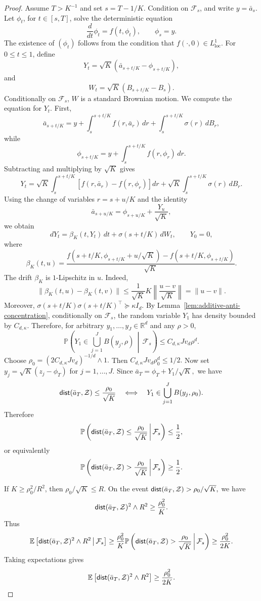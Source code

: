 \documentclass{article}
\newcommand{\1}{\mathbbm{1}}
\newcommand{\dist}{{\sf dist}}
\numberwithin{equation}{section}
\begin{document}
\begin{proof}
Assume \(T>K^{-1}\) and set
$
s=T-1/K.
$
Condition on \(\mathcal F_s\), and write
$
y=\bar a_s.
$
Let \(\phi_t\), for \(t\in[s,T]\), solve the deterministic equation
\[
\frac{d}{dt}\phi_t=f(t,\phi_t),
\qquad
\phi_s=y.
\]
The existence of \((\phi_t)\) follows from the condition that
\(f(\cdot,0)\in L^1_{\mathrm{loc}}\). For \(0\le t\le1\), define
\[
Y_t=\sqrt K\left(\bar a_{s+t/K}-\phi_{s+t/K}\right),
\]
and
\[
W_t=\sqrt K\left(B_{s+t/K}-B_s\right).
\]
Conditionally on \(\mathcal F_s\), \(W\) is a standard Brownian motion. We
compute the equation for \(Y_t\). First,
\[
\bar a_{s+t/K}
=
y+\int_s^{s+t/K}f(r,\bar a_r)\,dr
+
\int_s^{s+t/K}\sigma(r)\,dB_r,
\]
while
\[
\phi_{s+t/K}
=
y+\int_s^{s+t/K}f(r,\phi_r)\,dr.
\]
Subtracting and multiplying by \(\sqrt K\) gives
\[
Y_t
=
\sqrt K
\int_s^{s+t/K}
\left[f(r,\bar a_r)-f(r,\phi_r)\right]dr
+
\sqrt K
\int_s^{s+t/K}\sigma(r)\,dB_r.
\]
Using the change of variables \(r=s+u/K\) and the identity
\[
\bar a_{s+u/K}
=
\phi_{s+u/K}+\frac{Y_u}{\sqrt K},
\]
we obtain
\[
dY_t
=
\beta_K(t,Y_t)\,dt+\sigma(s+t/K)\,dW_t,
\qquad
Y_0=0,
\]
where
\[
\beta_K(t,u)
=
\frac{
f(s+t/K,\phi_{s+t/K}+u/\sqrt K)
-
f(s+t/K,\phi_{s+t/K})
}{\sqrt K}.
\]
The drift \(\beta_K\) is \(1\)-Lipschitz in \(u\). Indeed,
\[
\|\beta_K(t,u)-\beta_K(t,v)\|
\le
\frac1{\sqrt K}
K\left\|\frac{u-v}{\sqrt K}\right\|
=\|u-v\|.
\]
Moreover,
$
\sigma(s+t/K)\sigma(s+t/K)^\top\succeq \kappa I_d.
$ By Lemma~\ref{lem:additive-anti-concentration}, conditionally on
\(\mathcal F_s\), the random variable \(Y_1\) has density bounded by
\(C_{d,\kappa}\). Therefore, for arbitrary \(y_1,\ldots,y_J\in\mathbb R^d\)
and any \(\rho>0\),
\[
\mathbb P\left(
Y_1\in\bigcup_{j=1}^J B(y_j,\rho)
\,\middle|\,
\mathcal F_s
\right)
\le
C_{d,\kappa}J v_d\rho^d.
\]
Choose
$
\rho_0=\left(2C_{d,\kappa}J v_d\right)^{-1/d}\wedge 1.
$
Then
$
C_{d,\kappa}J v_d\rho_0^d\le 1/2.
$
Now set
$
y_j=\sqrt K(z_j-\phi_T)
$ for $j=1,\ldots,J$. Since
$
\bar a_T=\phi_T+Y_{1}/\sqrt{K},
$
we have
\[
\dist(\bar a_T,\mathcal Z)\le\frac{\rho_0}{\sqrt K}
\quad\Longleftrightarrow\quad
Y_1\in\bigcup_{j=1}^J B(y_j,\rho_0).
\]
Therefore
\[
\mathbb P\left(
\dist(\bar a_T,\mathcal Z)\le\frac{\rho_0}{\sqrt K}
\,\middle|\,
\mathcal F_s
\right)
\le
\frac12,
\]
or equivalently
\[
\mathbb P\left(
\dist(\bar a_T,\mathcal Z)>\frac{\rho_0}{\sqrt K}
\,\middle|\,
\mathcal F_s
\right)
\ge
\frac12.
\]

If \(K\ge \rho_0^2/R^2\), then \(\rho_0/\sqrt K\le R\). On the event
$
\dist(\bar a_T,\mathcal Z)>\rho_{0}/\sqrt{K},
$
we have
\[
\dist(\bar a_T,\mathcal Z)^2\wedge R^2
\ge
\frac{\rho_0^2}{K}.
\]
Thus
\[
\mathbb E\left[
\dist(\bar a_T,\mathcal Z)^2\wedge R^2
\,\middle|\,
\mathcal F_s
\right]
\ge
\frac{\rho_0^2}{K}
\mathbb P\left(
\dist(\bar a_T,\mathcal Z)>\frac{\rho_0}{\sqrt K}
\,\middle|\,
\mathcal F_s
\right)
\ge
\frac{\rho_0^2}{2K}.
\]
Taking expectations gives
\[
\mathbb E\left[\dist(\bar a_T,\mathcal Z)^2\wedge R^2\right]
\ge
\frac{\rho_0^2}{2K}.
\]


\end{proof}
\end{document}
